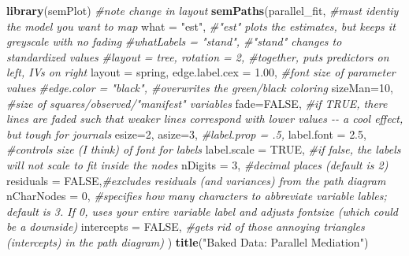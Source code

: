 \documentclass[
  11pt,
]{book}
\newenvironment{Shaded}{\begin{snugshade}}{\end{snugshade}}
\newcommand{\AttributeTok}[1]{\textcolor[rgb]{0.27,0.27,0.27}{#1}}
\newcommand{\CommentTok}[1]{\textcolor[rgb]{0.37,0.37,0.37}{\textit{#1}}}
\newcommand{\ConstantTok}[1]{\textcolor[rgb]{0.37,0.37,0.37}{#1}}
\newcommand{\DecValTok}[1]{\textcolor[rgb]{0.06,0.06,0.06}{#1}}
\newcommand{\FloatTok}[1]{\textcolor[rgb]{0.06,0.06,0.06}{#1}}
\newcommand{\FunctionTok}[1]{\textcolor[rgb]{0.27,0.27,0.27}{\textbf{#1}}}
\newcommand{\NormalTok}[1]{#1}
\newcommand{\StringTok}[1]{\textcolor[rgb]{0.5,0.5,0.5}{#1}}
\begin{document}
\begin{Shaded}
\begin{Highlighting}[]
\FunctionTok{library}\NormalTok{(semPlot)}
\CommentTok{\#note change in layout }
\FunctionTok{semPaths}\NormalTok{(parallel\_fit, }\CommentTok{\#must identiy the model you want to map}
         \AttributeTok{what =} \StringTok{"est"}\NormalTok{, }\CommentTok{\#"est" plots the estimates, but keeps it greyscale with no fading}
         \CommentTok{\#whatLabels = "stand", \#"stand" changes to standardized values}
         \CommentTok{\#layout = \textquotesingle{}tree\textquotesingle{}, rotation = 2, \#together, puts predictors on left, IVs on right }
         \AttributeTok{layout =} \StringTok{\textquotesingle{}spring\textquotesingle{}}\NormalTok{, }
         \AttributeTok{edge.label.cex =} \FloatTok{1.00}\NormalTok{, }\CommentTok{\#font size of parameter values}
         \CommentTok{\#edge.color = "black", \#overwrites the green/black coloring}
         \AttributeTok{sizeMan=}\DecValTok{10}\NormalTok{, }\CommentTok{\#size of squares/observed/"manifest" variables}
         \AttributeTok{fade=}\ConstantTok{FALSE}\NormalTok{, }\CommentTok{\#if TRUE, there lines are faded such that weaker lines correspond with lower values {-}{-} a cool effect, but tough for journals}
         \AttributeTok{esize=}\DecValTok{2}\NormalTok{, }
         \AttributeTok{asize=}\DecValTok{3}\NormalTok{,}
         \CommentTok{\#label.prop = .5,}
         \AttributeTok{label.font =} \FloatTok{2.5}\NormalTok{, }\CommentTok{\#controls size (I think) of font for labels}
         \AttributeTok{label.scale =} \ConstantTok{TRUE}\NormalTok{, }\CommentTok{\#if false, the labels will not scale to fit inside the nodes}
         \AttributeTok{nDigits =} \DecValTok{3}\NormalTok{, }\CommentTok{\#decimal places (default is 2)}
         \AttributeTok{residuals =} \ConstantTok{FALSE}\NormalTok{,}\CommentTok{\#excludes residuals (and variances) from the path diagram}
         \AttributeTok{nCharNodes =} \DecValTok{0}\NormalTok{, }\CommentTok{\#specifies how many characters to abbreviate variable lables; default is 3.  If 0, uses your entire variable label and adjusts fontsize (which could be a downside)}
         \AttributeTok{intercepts =} \ConstantTok{FALSE}\NormalTok{, }\CommentTok{\#gets rid of those annoying triangles (intercepts) in the path diagram)}
\NormalTok{)}
\FunctionTok{title}\NormalTok{(}\StringTok{"Baked Data:  Parallel Mediation"}\NormalTok{)}
\end{Highlighting}
\end{Shaded}
\end{document}
